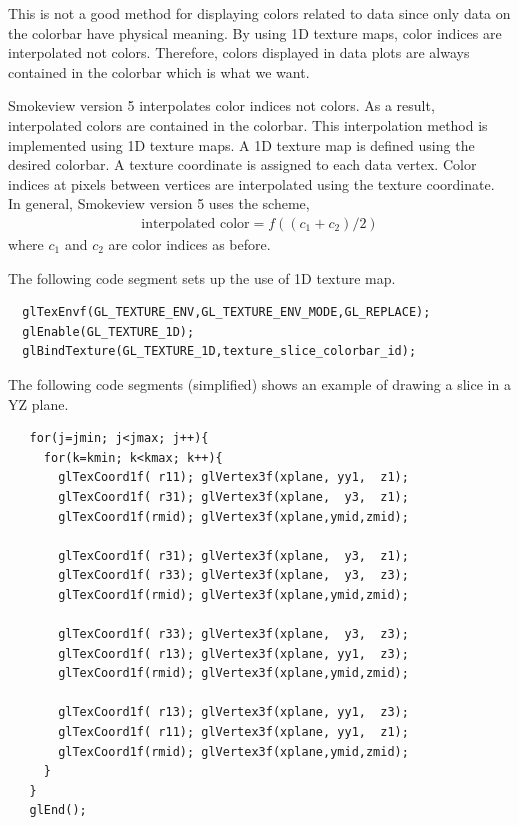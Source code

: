 \documentclass[11pt,twoside]{book}
\begin{document}
This is not a good method for displaying colors related to data since only data on the colorbar have physical meaning.  By using 1D texture maps, color indices are interpolated not colors.  Therefore, colors displayed in data plots are always contained in the colorbar which is what we want.

Smokeview version 5 interpolates color indices not colors.
As a result, interpolated colors are contained in the colorbar.  This interpolation method is implemented using 1D texture maps.  A 1D texture map is defined using the desired colorbar.  A texture coordinate is assigned to each data vertex.    Color indices at pixels between vertices are interpolated using the texture coordinate.  In general, Smokeview version 5 uses the scheme,
\begin{eqnarray*}
\mbox{interpolated color}=f((c_1+c_2)/2)
\end{eqnarray*}
where $c_1$ and $c_2$ are color indices as before.

The following code segment sets up the use of 1D texture map.

\begin{verbatim}
  glTexEnvf(GL_TEXTURE_ENV,GL_TEXTURE_ENV_MODE,GL_REPLACE);
  glEnable(GL_TEXTURE_1D);
  glBindTexture(GL_TEXTURE_1D,texture_slice_colorbar_id);
\end{verbatim}

The following code segments (simplified) shows an example of drawing a slice in a YZ plane.

\begin{verbatim}
   for(j=jmin; j<jmax; j++){
     for(k=kmin; k<kmax; k++){
       glTexCoord1f( r11); glVertex3f(xplane, yy1,  z1);
       glTexCoord1f( r31); glVertex3f(xplane,  y3,  z1);
       glTexCoord1f(rmid); glVertex3f(xplane,ymid,zmid);

       glTexCoord1f( r31); glVertex3f(xplane,  y3,  z1);
       glTexCoord1f( r33); glVertex3f(xplane,  y3,  z3);
       glTexCoord1f(rmid); glVertex3f(xplane,ymid,zmid);

       glTexCoord1f( r33); glVertex3f(xplane,  y3,  z3);
       glTexCoord1f( r13); glVertex3f(xplane, yy1,  z3);
       glTexCoord1f(rmid); glVertex3f(xplane,ymid,zmid);

       glTexCoord1f( r13); glVertex3f(xplane, yy1,  z3);
       glTexCoord1f( r11); glVertex3f(xplane, yy1,  z1);
       glTexCoord1f(rmid); glVertex3f(xplane,ymid,zmid);
     }
   }
   glEnd();
\end{verbatim}
\end{document}
